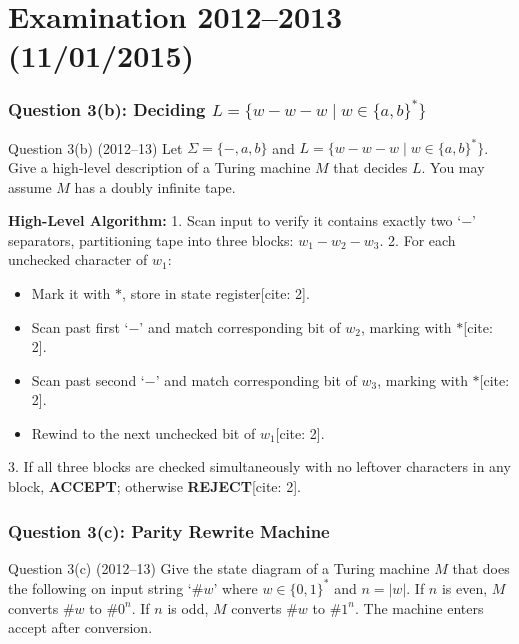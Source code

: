 \documentclass[11pt,a4paper]{article}
\begin{document}
\part{Examination 2012--2013 (11/01/2015)}

\section{Question 3(b): Deciding $L = \{w-w-w \mid w \in \{a, b\}^*\}$}
\begin{questionbox}{Question 3(b) (2012--13)}
Let $\Sigma = \{-, a, b\}$ and $L = \{w-w-w \mid w \in \{a, b\}^*\}$. Give a high-level description of a Turing machine $M$ that decides $L$. You may assume $M$ has a doubly infinite tape.
\end{questionbox}

\begin{solutionbox}
\textbf{High-Level Algorithm:}
1. Scan input to verify it contains exactly two `$-$' separators, partitioning tape into three blocks: $w_1 - w_2 - w_3$.
2. For each unchecked character of $w_1$:
   \begin{itemize}
       \item Mark it with $*$, store in state register[cite: 2].
       \item Scan past first `$-$' and match corresponding bit of $w_2$, marking with $*$[cite: 2].
       \item Scan past second `$-$' and match corresponding bit of $w_3$, marking with $*$[cite: 2].
       \item Rewind to the next unchecked bit of $w_1$[cite: 2].
   \end{itemize}
3. If all three blocks are checked simultaneously with no leftover characters in any block, \textbf{ACCEPT}; otherwise \textbf{REJECT}[cite: 2].
\end{solutionbox}

\section{Question 3(c): Parity Rewrite Machine}
\begin{questionbox}{Question 3(c) (2012--13)}
Give the state diagram of a Turing machine $M$ that does the following on input string `$\#w$' where $w \in \{0, 1\}^*$ and $n = |w|$. If $n$ is even, $M$ converts $\#w$ to $\#0^n$. If $n$ is odd, $M$ converts $\#w$ to $\#1^n$. The machine enters accept after conversion.
\end{questionbox}
\end{document}
